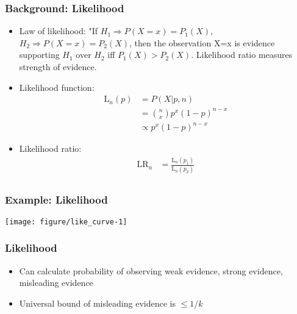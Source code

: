 \documentclass{beamer}\usepackage[]{graphicx}\usepackage[]{color}
\makeatletter
\def\maxwidth{ %
  \ifdim\Gin@nat@width>\linewidth
    \linewidth
  \else
    \Gin@nat@width
  \fi
}
\newenvironment{knitrout}{}{} %
\makeatother
\begin{document}
\begin{frame}
\frametitle{Background: Likelihood}
    \begin{itemize}
        \item Law of likelihood: "If $H_1 \Rightarrow P(X=x) = P_1(X)$, $H_2 \Rightarrow P(X=x)=P_2(X)$, then the observation X=x is evidence supporting $H_1$ over $H_2$ iff $P_1(X) > P_2(X)$. Likelihood ratio measures strength of evidence. 
        \item Likelihood function: 
\begin{equation}
\begin{aligned}
\mbox{L}_n(p) &= P(X \vert p, n) \\
&= {n \choose x} p^x (1-p)^{n-x} \\
& \propto p^x (1-p)^{n-x}
\end{aligned}
\end{equation}
      \item Likelihood ratio:
\begin{equation}
\begin{aligned}
\mbox{LR}_n & = \frac{\mbox{L}_n(p_1)}{\mbox{L}_n(p_2)}  \\
\end{aligned}
\end{equation}
    \end{itemize}
\end{frame}

\begin{frame}
\frametitle{Example: Likelihood}
\vspace{-2cm}
\begin{knitrout}
\color{fgcolor}
\texttt{[image: figure/like\_curve-1]} 

\end{knitrout}
\end{frame}

\begin{frame}
\frametitle{Likelihood}
    \begin{itemize}
        \item Can calculate probability of observing weak evidence, strong evidence, misleading evidence %
        \item Universal bound of misleading evidence is $\leq 1/k$
    \end{itemize}
\end{frame}
\end{document}

